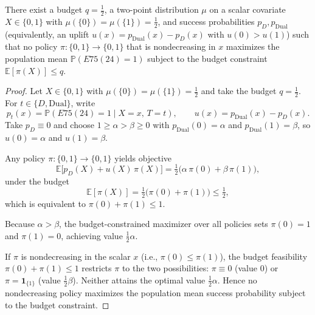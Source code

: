 ﻿\begin{theorem}\label{thm-nonmonotone-optimality}
There exist a budget $q=\tfrac12$, a two-point distribution $\mu$ on a scalar covariate $X\in\{0,1\}$ with $\mu(\{0\})=\mu(\{1\})=\tfrac12$, and success probabilities $p_D, p_{\mathrm{Dual}}$ (equivalently, an uplift $u(x)=p_{\mathrm{Dual}}(x)-p_D(x)$ with $u(0)>u(1)$) such that no policy $\pi:\{0,1\}\to\{0,1\}$ that is nondecreasing in $x$ maximizes the population mean $\mathbb{P}(E75(24)=1)$ subject to the budget constraint $\mathbb{E}[\pi(X)]\le q$.
\end{theorem}

\begin{proof}
Let $X\in\{0,1\}$ with $\mu(\{0\})=\mu(\{1\})=\tfrac12$ and take the budget $q=\tfrac12$. For $t\in\{D,\mathrm{Dual}\}$, write 
\[
 p_t(x)=\mathbb{P}(E75(24)=1\mid X=x,\,T=t),\qquad u(x)=p_{\mathrm{Dual}}(x)-p_D(x).
\]
Take $p_D\equiv 0$ and choose $1\ge \alpha>\beta\ge 0$ with $p_{\mathrm{Dual}}(0)=\alpha$ and $p_{\mathrm{Dual}}(1)=\beta$, so $u(0)=\alpha$ and $u(1)=\beta$.

Any policy $\pi:\{0,1\}\to\{0,1\}$ yields objective
\[
\mathbb{E}\big[p_D(X)+u(X)\,\pi(X)\big]=\tfrac12\big(\alpha\,\pi(0)+\beta\,\pi(1)\big),
\]
under the budget
\[
\mathbb{E}[\pi(X)]=\tfrac12\big(\pi(0)+\pi(1)\big)\le \tfrac12,
\]
which is equivalent to $\pi(0)+\pi(1)\le 1$.

Because $\alpha>\beta$, the budget-constrained maximizer over all policies sets $\pi(0)=1$ and $\pi(1)=0$, achieving value $\tfrac12\alpha$.

If $\pi$ is nondecreasing in the scalar $x$ (i.e., $\pi(0)\le \pi(1)$), the budget feasibility $\pi(0)+\pi(1)\le 1$ restricts $\pi$ to the two possibilities: $\pi\equiv 0$ (value $0$) or $\pi=\mathbf{1}_{\{1\}}$ (value $\tfrac12\beta$). Neither attains the optimal value $\tfrac12\alpha$. Hence no nondecreasing policy maximizes the population mean success probability subject to the budget constraint. \qedhere
\end{proof}
